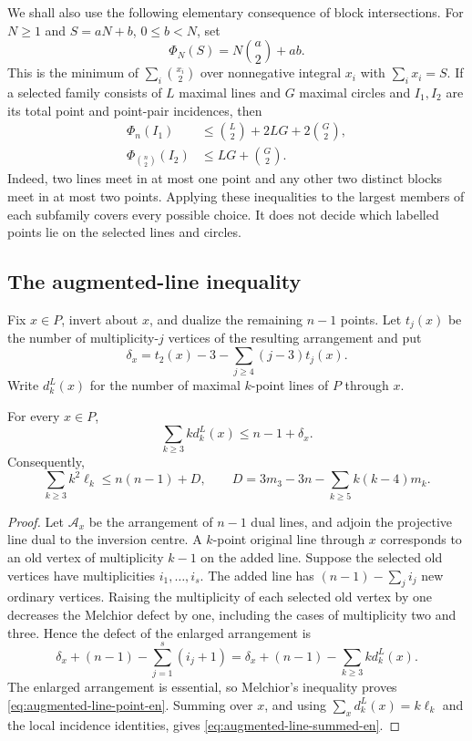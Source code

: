 We shall also use the following elementary consequence of block intersections.
For $N\ge1$ and $S=aN+b$, $0\le b<N$, set
\[
 \Phi_N(S)=N\binom a2+ab.
\]
This is the minimum of $\sum_i\binom{x_i}{2}$ over nonnegative integral
$x_i$ with $\sum_i x_i=S$.  If a selected family consists of $L$ maximal
lines and $G$ maximal circles and $I_1,I_2$ are its total point and point-pair
incidences, then
\begin{align}
 \Phi_n(I_1)&\le \binom L2+2LG+2\binom G2,
 \label{eq:small-block-point-en}\\
 \Phi_{\binom n2}(I_2)&\le LG+\binom G2.
 \label{eq:small-block-pair-en}
\end{align}
Indeed, two lines meet in at most one point and any other two distinct blocks
meet in at most two points.  Applying these inequalities to the largest
members of each subfamily covers every possible choice.  It does not decide
which labelled points lie on the selected lines and circles.

\subsection{The augmented-line inequality}

Fix $x\in P$, invert about $x$, and dualize the remaining $n-1$ points.  Let
$t_j(x)$ be the number of multiplicity-$j$ vertices of the resulting
arrangement and put
\[
 \delta_x=t_2(x)-3-\sum_{j\ge4}(j-3)t_j(x).
\]
Write $d_k^L(x)$ for the number of maximal $k$-point lines of $P$ through
$x$.

\begin{lemma}\label{lem:augmented-line-en}
For every $x\in P$,
\begin{equation}\label{eq:augmented-line-point-en}
 \sum_{k\ge3}k d_k^L(x)\le n-1+\delta_x.
\end{equation}
Consequently,
\begin{equation}\label{eq:augmented-line-summed-en}
 \sum_{k\ge3}k^2\ell_k\le n(n-1)+D,
 \qquad
 D=3m_3-3n-\sum_{k\ge5}k(k-4)m_k.
\end{equation}
\end{lemma}

\begin{proof}
Let $\mathcal A_x$ be the arrangement of $n-1$ dual lines, and adjoin the
projective line dual to the inversion centre.  A $k$-point original line
through $x$ corresponds to an old vertex of multiplicity $k-1$ on the added
line.  Suppose the selected old vertices have multiplicities $i_1,\ldots,i_s$.
The added line has
$(n-1)-\sum_j i_j$ new ordinary vertices.  Raising the multiplicity of each
selected old vertex by one decreases the Melchior defect by one, including
the cases of multiplicity two and three.  Hence the defect of the enlarged
arrangement is
\[
 \delta_x+(n-1)-\sum_{j=1}^s(i_j+1)
 =\delta_x+(n-1)-\sum_{k\ge3}k d_k^L(x).
\]
The enlarged arrangement is essential, so Melchior's inequality proves
\eqref{eq:augmented-line-point-en}.  Summing over $x$, and using
$\sum_xd_k^L(x)=k\ell_k$ and the local incidence identities, gives
\eqref{eq:augmented-line-summed-en}.
\end{proof}

